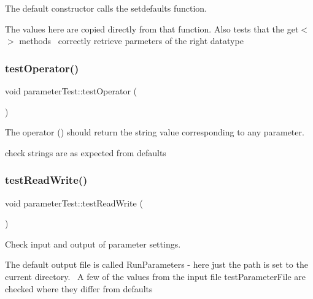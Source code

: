 The default constructor calls the setdefaults function. 

The values here are copied directly from that function. Also tests that the get$<$$>$ methods~\newline
correctly retrieve parmeters of the right datatype \mbox{\label{classparameterTest_a099ef3c9d0a74ada96f9dd8bd4c168e6}} 
\subsubsection{\texorpdfstring{test\+Operator()}{testOperator()}}
{\footnotesize\ttfamily void parameter\+Test\+::test\+Operator (\begin{DoxyParamCaption}{ }\end{DoxyParamCaption})\hspace{0.3cm}{\ttfamily [inline]}}



The operator () should return the string value corresponding to any parameter. 

check strings are as expected from defaults \mbox{\label{classparameterTest_a73ffa897b723095fdb3f06cc309575d6}} 
\subsubsection{\texorpdfstring{test\+Read\+Write()}{testReadWrite()}}
{\footnotesize\ttfamily void parameter\+Test\+::test\+Read\+Write (\begin{DoxyParamCaption}{ }\end{DoxyParamCaption})\hspace{0.3cm}{\ttfamily [inline]}}



Check input and output of parameter settings. 

The default output file is called Run\+Parameters -\/ here just the path is set to the current directory.~\newline
 A few of the values from the input file test\+Parameter\+File are checked where they differ from defaults \mbox{\label{classparameterTest_ae8748da779947e5ddac496a38e1b07b8}} 
